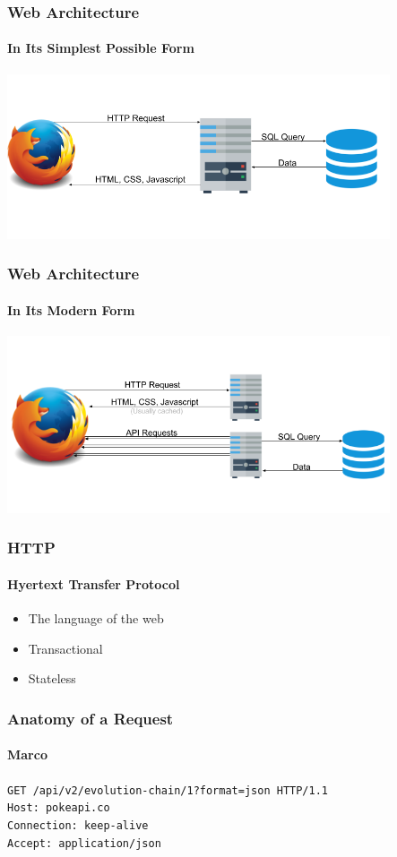 \documentclass[dvipsnames]{beamer}
\begin{document}
\begin{frame}
  \frametitle{Web Architecture}
  \framesubtitle{In Its Simplest Possible Form}
  \includegraphics[width=320pt]{img/web-architecture-1.png}
\end{frame}


\begin{frame}
  \frametitle{Web Architecture}
  \framesubtitle{In Its Modern Form}
  \includegraphics[width=320pt]{img/web-architecture-2.png}
\end{frame}


\begin{frame}
  \frametitle{HTTP}
  \framesubtitle{Hyertext Transfer Protocol}
  \begin{itemize}
    \item The language of the web
    \item Transactional
    \item Stateless
  \end{itemize}
\end{frame}


\begin{frame}
  \frametitle{Anatomy of a Request}
  \framesubtitle{Marco}
  \texttt{{\color{red}GET} {\color{OliveGreen}/api/v2/evolution-chain/1}{\color{purple}?format=json} {\color{blue}HTTP/1.1}} \\
  \pause
  \bigskip
  {
    \color{olive}
    \texttt{Host: pokeapi.co} \\
    \texttt{Connection: keep-alive} \\
    \texttt{Accept: application/json} \\
  }
\end{frame}
\end{document}
